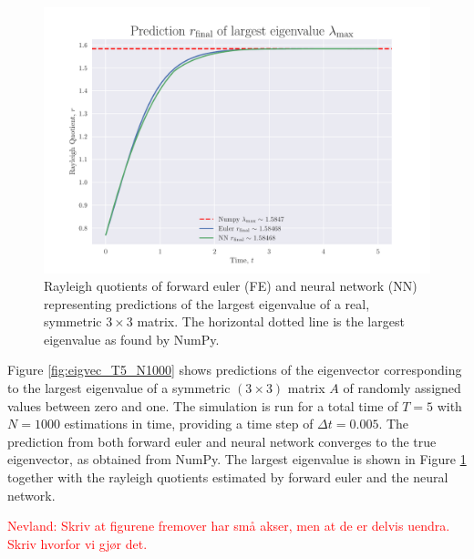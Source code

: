 \documentclass[12pt]{extarticle}
\begin{document}
\begin{figure}[h]
	\centering
	\includegraphics[scale=0.75]{../output/plots/eigval_T5_N1000.pdf}
	\caption{Rayleigh quotients of forward euler (FE) and neural network (NN) representing predictions of the largest eigenvalue of a real, symmetric $3\times 3$ matrix. The horizontal dotted line is the largest eigenvalue as found by NumPy.}
	\label{fig:eigval_T5_N1000}
\end{figure}

Figure \ref{fig:eigvec_T5_N1000} shows predictions of the eigenvector corresponding to the largest eigenvalue of a symmetric $(3\times 3)$ matrix $A$ of randomly assigned values between zero and one. The simulation is run for a total time of $T=5$ with $N=1000$ estimations in time, providing a time step of $\Delta t = 0.005$. The prediction from both forward euler and neural network converges to the true eigenvector, as obtained from NumPy. The largest eigenvalue is shown in Figure \ref{fig:eigval_T5_N1000} together with the rayleigh quotients estimated by forward euler and the neural network.

\textcolor{red}{Nevland: Skriv at figurene fremover har små akser, men at de er delvis uendra. Skriv hvorfor vi gjør det.}
\end{document}
